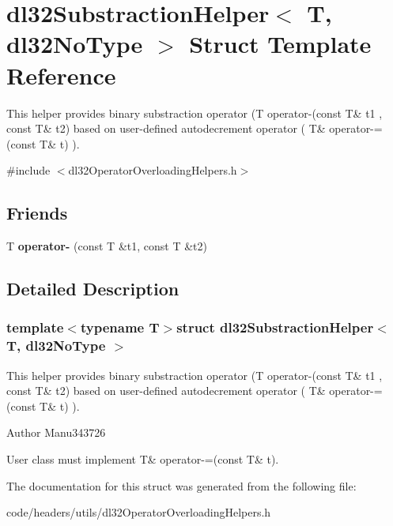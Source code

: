 \hypertarget{structdl32_substraction_helper_3_01_t_00_01dl32_no_type_01_4}{\section{dl32\-Substraction\-Helper$<$ T, dl32\-No\-Type $>$ Struct Template Reference}
\label{structdl32_substraction_helper_3_01_t_00_01dl32_no_type_01_4}
}


This helper provides binary substraction operator (T operator-\/(const T\& t1 , const T\& t2) based on user-\/defined autodecrement operator ( T\& operator-\/=(const T\& t) ).  




{\ttfamily \#include $<$dl32\-Operator\-Overloading\-Helpers.\-h$>$}

\subsection*{Friends}
\begin{DoxyCompactItemize}
\item 
\hypertarget{structdl32_substraction_helper_3_01_t_00_01dl32_no_type_01_4_a7f38e1b121158534aaba5ec82a101561}{T {\bfseries operator-\/} (const T \&t1, const T \&t2)}\label{structdl32_substraction_helper_3_01_t_00_01dl32_no_type_01_4_a7f38e1b121158534aaba5ec82a101561}

\end{DoxyCompactItemize}


\subsection{Detailed Description}
\subsubsection*{template$<$typename T$>$struct dl32\-Substraction\-Helper$<$ T, dl32\-No\-Type $>$}

This helper provides binary substraction operator (T operator-\/(const T\& t1 , const T\& t2) based on user-\/defined autodecrement operator ( T\& operator-\/=(const T\& t) ). 

\begin{DoxyAuthor}{Author}
Manu343726
\end{DoxyAuthor}
User class must implement T\& operator-\/=(const T\& t). 

The documentation for this struct was generated from the following file\-:\begin{DoxyCompactItemize}
\item 
code/headers/utils/dl32\-Operator\-Overloading\-Helpers.\-h\end{DoxyCompactItemize}

